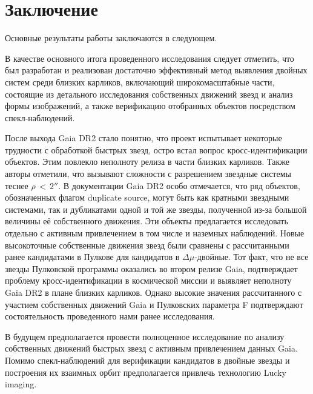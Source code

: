 \chapter*{Заключение}                       %


Основные результаты работы заключаются в следующем.

В качестве основного итога проведенного исследования следует отметить, что был разработан и реализован достаточно эффективный метод выявления двойных систем среди близких карликов, включающий широкомасштабные части, состоящие из детального исследования собственных движений звезд и анализ формы изображений, а также верификацию отобранных объектов посредством спекл-наблюдений.

После выхода Gaia DR2 стало понятно, что проект испытывает некоторые трудности с обработкой быстрых звезд, остро встал вопрос кросс-идентификации объектов. Этим повлекло неполноту релиза в части близких карликов. Также авторы отметили, что вызывают сложности с разрешением звездные системы теснее $\rho\,<\,2''$. В документации Gaia DR2 особо отмечается, что ряд объектов, обозначенных флагом \glqq duplicate source\grqq , могут быть как кратными звездными системами, так и дубликатами одной и той же звезды, полученной из-за большой величины её собственного движения. Эти объекты предлагается исследовать отдельно с активным привлечением в том числе и наземных наблюдений. Новые высокоточные собственные движения звезд были сравнены с рассчитанными ранее кандидатами в Пулкове для кандидатов в $\Delta\mu$-двойные. Тот факт, что не все звезды Пулковской программы оказались во втором релизе Gaia, подтверждает проблему кросс-идентификации в космической миссии и выявляет неполноту Gaia DR2 в плане близких карликов. Однако высокие значения рассчитанного с участием собственных движений Gaia и Пулковских параметра F подтверждают состоятельность проведенного нами ранее исследования.

В будущем предполагается провести полноценное исследование по анализу собственных движений быстрых звезд с активным привлечением данных Gaia. Помимо спекл-наблюдений для верификации кандидатов в двойные звезды и построения их взаимных орбит предполагается привлечь технологию \glqq Lucky imaging\grqq .
